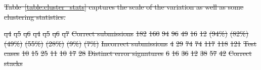 \documentclass[12pt,twoside]{mitthesis}
\providecommand{\DIFdeltex}[1]{{\protect\color{red}\sout{#1}}}                      %
\providecommand{\DIFdelFL}[1]{\DIFdel{#1}} %
\providecommand{\DIFdel}[1]{\texorpdfstring{\DIFdeltex{#1}}{}} %
\begin{document}
\DIFdel{Table~\ref{table:cluster_stats} captures the scale of the variation as well as some clustering statistics.
}%

\DIFdelFL{q4 }%
\DIFdelFL{q5 }%
\DIFdelFL{q6 }%
\DIFdelFL{q4 }%
\DIFdelFL{q5 }%
\DIFdelFL{q6 }%
\DIFdelFL{q7 }%
\DIFdelFL{Correct submissions }%
\DIFdelFL{182 }%
\DIFdelFL{160 }%
\DIFdelFL{94 }%
\DIFdelFL{96 }%
\DIFdelFL{49 }%
\DIFdelFL{16 }%
\DIFdelFL{12 }%
\DIFdelFL{(94\%) }%
\DIFdelFL{(82\%) }%
\DIFdelFL{(49\%) }%
\DIFdelFL{(55\%) }%
\DIFdelFL{(28\%) }%
\DIFdelFL{(9\%) }%
\DIFdelFL{(7\%) }%
\DIFdelFL{Incorrect submissions }%
\DIFdelFL{4 }%
\DIFdelFL{29 }%
\DIFdelFL{74 }%
\DIFdelFL{74 }%
\DIFdelFL{117 }%
\DIFdelFL{118 }%
\DIFdelFL{121 }%
\DIFdelFL{Test cases }%
\DIFdelFL{10 }%
\DIFdelFL{15 }%
\DIFdelFL{25 }%
\DIFdelFL{11 }%
\DIFdelFL{10 }%
\DIFdelFL{17 }%
\DIFdelFL{28 }%
\DIFdelFL{Distinct error signatures }%
\DIFdelFL{6 }%
\DIFdelFL{16 }%
\DIFdelFL{36 }%
\DIFdelFL{12 }%
\DIFdelFL{38 }%
\DIFdelFL{57 }%
\DIFdelFL{42 }%
\DIFdelFL{Correct stacks }%
\end{document}

